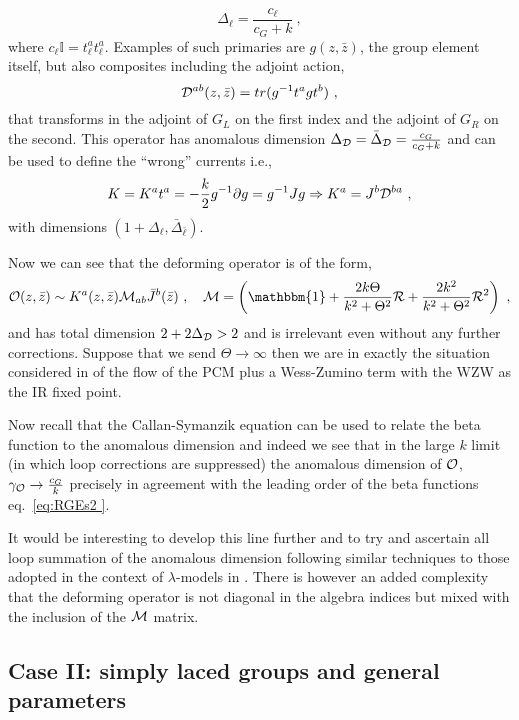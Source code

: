 \documentclass[12pt]{article}
\def\ee{\boldsymbol{e}}
\def\be{\begin{equation}}
\def\ee{\end{equation}}
\begin{document}
   \be
   \Delta_\ell = \frac{c_\ell}{c_G + k} \ ,
   \ee
   where $c_\ell \mathbb{I} = t^a_\ell t^a_\ell$.   Examples of such primaries are $g(z,\bar z)$, the group element itself, but also composites including the adjoint action,
      \be
  {\cal D}^{ab}(z,\bar{z})  = tr(g^{-1} t^a g t^b )  \ , 
  \ee
  that transforms in the adjoint of $G_L$ on the first index and the adjoint of $G_R$ on the second.  This operator  has anomalous dimension $\Delta_{{\cal D}}  =  \bar\Delta_{{\cal D}}  = \frac{c_G}{c_G+ k}$  and   can be used to define the ``wrong'' currents i.e., 
\be
K = K^a t^a =  - \frac{k}{2}g^{-1} \partial g   = g^{-1} J g \Rightarrow K^a = J^b {\cal D}^{b a}  \ ,
\ee
 with dimensions $(1+ \Delta_\ell, \bar\Delta_{\bar \ell}) $. 
 
 
 Now we can see that the deforming operator is of the form, 
\be\label{eq:Defop}
{\cal O}(z,\bar{z}) \sim   K^a(z,\bar{z}) {\cal M}_{ab} \bar{J}^b(\bar z)   \ , \quad  {\cal M} = \left(  \mathbbm{1} + \frac{2 k\Theta  }{k^2 + \Theta^2} {\cal R}  +  \frac{ 2 k^2  }{k^2 + \Theta^2}    {\cal R}^2 \right)\ ,
\ee
 and has total dimension $2 +2 \Delta_{\cal D} > 2$ and is irrelevant even without any further corrections.   Suppose that we send $\Theta \to \infty$ then we are in exactly the situation considered in \cite{Witten:1983ar,Knizhnik:1984nr} of the flow of the PCM plus  a Wess-Zumino term with the WZW as the IR fixed point.    
 
 Now recall that the Callan-Symanzik equation can be used to relate the beta function to the anomalous dimension and indeed we see that in the large $k$ limit (in which loop corrections are suppressed) the anomalous dimension of ${\cal O}$, $\gamma_{\cal O}  \to \frac{c_G}{k}$ precisely in agreement with the leading order of the beta functions  eq.~\eqref{eq:RGEs2 }.
 
 It would be interesting to develop this line further and to try and ascertain all loop summation of the anomalous dimension following similar techniques to those adopted in the context of $\lambda$-models in   \cite{Georgiou:2015nka}.  There is however an added complexity that the deforming operator is not diagonal in the algebra indices but mixed with the inclusion of the ${\cal M}$ matrix. 
 



\subsection{Case II: simply laced groups and general parameters}
\end{document}
